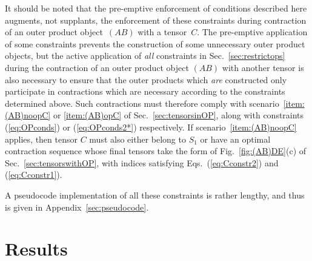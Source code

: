 \documentclass[aps,pre,reprint,superscriptaddress,amsfonts,amsmath,showpacs,nofootinbib,floatfix]{revtex4-1}
\newcommand{\eref}[1]{(\ref{#1})}
\newcommand{\Erefs}[2]{Eqs.~(\ref{#1}) and (\ref{#2})}
\newcommand{\fref}[1]{Fig.~\ref{#1}}
\newcommand{\sref}[1]{Sec.~\ref{#1}}
\newcommand{\scref}[1]{scenario~\ref{#1}}
\newcommand{\aref}[1]{Appendix~\ref{#1}}
\begin{document}
It should be noted that the pre-emptive enforcement of conditions described here augments, not supplants, the enforcement of these constraints during contraction of an outer product object~$(AB)$ with a tensor~$C$. 
The pre-emptive application of some constraints prevents the construction of some unnecessary outer product objects, but the active application of \emph{all} constraints in \sref{sec:restrictops} during the contraction of an outer product object $(AB)$ with another tensor is also necessary to ensure that the outer products which \emph{are} constructed only participate in contractions which are necessary according to the constraints determined above.
Such contractions must therefore comply with scenario~\ref{item:(AB)noopC} or \ref{item:(AB)opC} of \sref{sec:tensorsinOP}, along with constraints \eref{eq:OPconds} or \eref{eq:OPconds2*} respectively. If \scref{item:(AB)noopC} applies, then tensor $C$ must also either belong to $S_1$ or have an optimal contraction sequence whose final tensors take the form of \fref{fig:(AB)DE}(c) of \sref{sec:tensorswithOP}, with indices satisfying \Erefs{eq:Cconstr2}{eq:Cconstr1}. 

A pseudocode implementation of all these constraints is rather lengthy, and thus is given in \aref{sec:pseudocode}. %

\section{Results\label{sec:results}}
\end{document}
